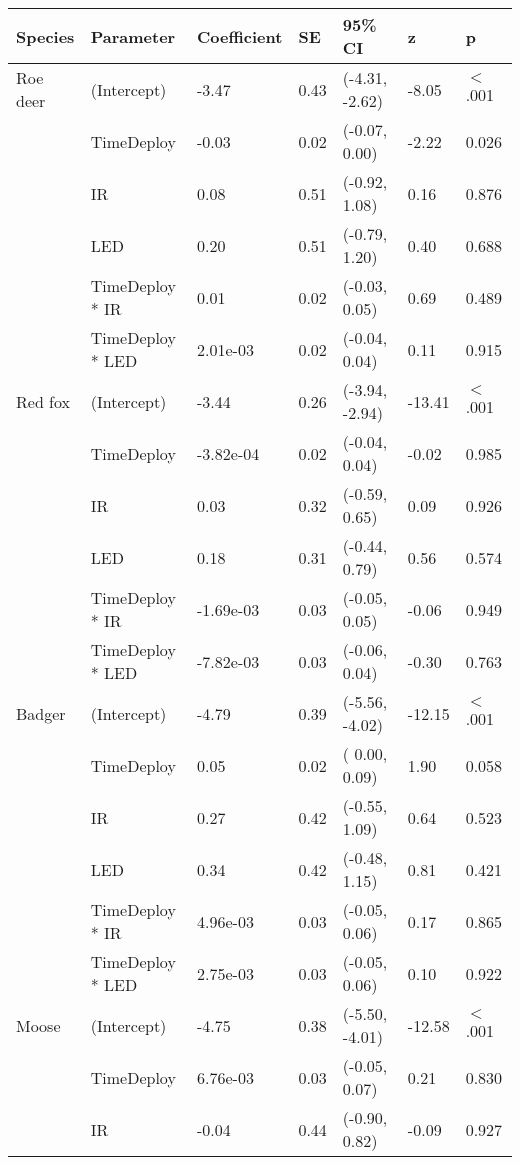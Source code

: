 \begin{table}[ht]
\centering
\begin{tabular}{lllllll}
  \hline
Species & Parameter & Coefficient & SE & 95\% CI & z & p \\ 
  \hline
Roe deer & (Intercept) & -3.47 & 0.43 & (-4.31, -2.62) & -8.05 & $<$ .001 \\ 
   & TimeDeploy & -0.03 & 0.02 & (-0.07,  0.00) & -2.22 & 0.026  \\ 
   & IR & 0.08 & 0.51 & (-0.92,  1.08) & 0.16 & 0.876  \\ 
   & LED & 0.20 & 0.51 & (-0.79,  1.20) & 0.40 & 0.688  \\ 
   & TimeDeploy * IR & 0.01 & 0.02 & (-0.03,  0.05) & 0.69 & 0.489  \\ 
   & TimeDeploy * LED & 2.01e-03 & 0.02 & (-0.04,  0.04) & 0.11 & 0.915  \\ 
  Red fox & (Intercept) & -3.44 & 0.26 & (-3.94, -2.94) & -13.41 & $<$ .001 \\ 
   & TimeDeploy & -3.82e-04 & 0.02 & (-0.04,  0.04) & -0.02 & 0.985  \\ 
   & IR & 0.03 & 0.32 & (-0.59,  0.65) & 0.09 & 0.926  \\ 
   & LED & 0.18 & 0.31 & (-0.44,  0.79) & 0.56 & 0.574  \\ 
   & TimeDeploy * IR & -1.69e-03 & 0.03 & (-0.05,  0.05) & -0.06 & 0.949  \\ 
   & TimeDeploy * LED & -7.82e-03 & 0.03 & (-0.06,  0.04) & -0.30 & 0.763  \\ 
  Badger & (Intercept) & -4.79 & 0.39 & (-5.56, -4.02) & -12.15 & $<$ .001 \\ 
   & TimeDeploy & 0.05 & 0.02 & ( 0.00,  0.09) & 1.90 & 0.058  \\ 
   & IR & 0.27 & 0.42 & (-0.55,  1.09) & 0.64 & 0.523  \\ 
   & LED & 0.34 & 0.42 & (-0.48,  1.15) & 0.81 & 0.421  \\ 
   & TimeDeploy * IR & 4.96e-03 & 0.03 & (-0.05,  0.06) & 0.17 & 0.865  \\ 
   & TimeDeploy * LED & 2.75e-03 & 0.03 & (-0.05,  0.06) & 0.10 & 0.922  \\ 
  Moose & (Intercept) & -4.75 & 0.38 & (-5.50, -4.01) & -12.58 & $<$ .001 \\ 
   & TimeDeploy & 6.76e-03 & 0.03 & (-0.05,  0.07) & 0.21 & 0.830  \\ 
   & IR & -0.04 & 0.44 & (-0.90,  0.82) & -0.09 & 0.927  \\ 

\end{tabular}
\end{table}

